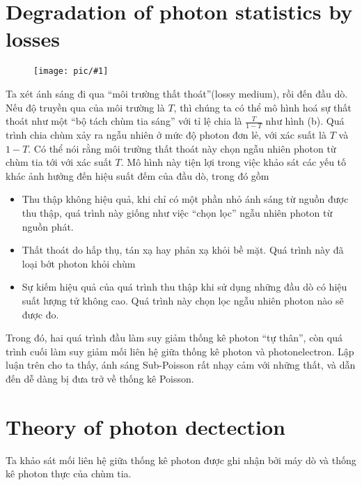 \documentclass{report}
\newcommand{\image}[1]{
\begin{figure}[H]
	\centering
	\texttt{[image: pic/\#1]}
	\label{#1}
\end{figure}
}
\newcommand{\q}[1]{``#1''}
\begin{document}
\section{Degradation of photon statistics by losses}
\image{splitBeamer.png}
Ta xét ánh sáng đi qua \q{môi trường thất thoát}(lossy medium), rồi đến đầu dò. Nếu độ truyền qua của môi trường là $T$, thì chúng ta có thể mô hình hoá sự thất thoát như một \q{bộ tách chùm tia sáng} với tỉ lệ chia là $\frac{T}{1-T}$ như hình (b). Quá trình chia chùm xảy ra ngẫu nhiên ở mức độ photon đơn lẻ, với xác suất là $T$ và $1-T$. Có thể nói rằng môi trường thất thoát này chọn ngẫu nhiên photon từ chùm tia tới với xác suất $T$. Mô hình này tiện lợi trong việc khảo sát các yếu tố khác ảnh hưởng đến hiệu suất đếm của đầu dò, trong đó gồm
\begin{itemize}
	\item Thu thập không hiệu quả, khi chỉ có một phần nhỏ ánh sáng từ nguồn được thu thập, quá trình này giống như việc \q{chọn lọc} ngẫu nhiên photon từ nguồn phát.
	\item Thất thoát do hấp thụ, tán xạ hay phản xạ khỏi bề mặt. Quá trình này đã loại bớt photon khỏi chùm
	\item Sự kiếm hiệu quả của quá trình thu thập khi sử dụng những đầu dò có hiệu suất lượng tử không cao. Quá trình này chọn lọc ngẫu nhiên photon nào sẽ được đo.
\end{itemize}
Trong đó, hai quá trình đầu làm suy giảm thống kê photon \q{tự thân}, còn quá trình cuối làm suy giảm mối liên hệ giữa thống kê photon và photonelectron. Lập luận trên cho ta thấy, ánh sáng Sub-Poisson rất nhạy cảm với những thất, và dẫn đến dễ dàng bị đưa trở về thống kê Poisson.
\section{Theory of photon dectection}
Ta khảo sát mối liên hệ giữa thống kê photon được ghi nhận bởi máy dò và thống kê photon thực của chùm tia.
\end{document}
